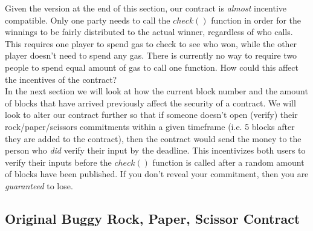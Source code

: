 \documentclass[10pt,twocolumn,letterpaper]{article}
\begin{document}
Given the version at the end of this section, our contract is \textit{almost} incentive compatible. Only one party needs to call the $check()$ function in order for the winnings to be fairly distributed to the actual winner, regardless of who calls. This requires one player to spend gas to check to see who won, while the other player doesn't need to spend any gas. There is currently no way to require two people to spend equal amount of gas to call one function. How could this affect the incentives of the contract? \\

In the next section we will look at how the current block number and the amount of blocks that have arrived previously affect the security of a contract. We will look to alter our contract further so that if someone doesn't open (verify) their rock/paper/scissors commitments within a given timeframe (i.e. 5 blocks after they are added to the contract), then the contract would send the money to the person who \textit{did} verify their input by the deadline. This incentivizes both users to verify their inputs before the $check()$ function is called after a random amount of blocks have been published. If you don't reveal your commitment, then you are \textit{guaranteed} to lose.


\subsection{Original Buggy Rock, Paper, Scissor Contract}
\end{document}
